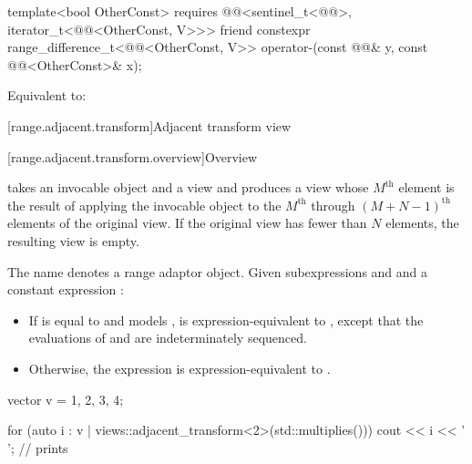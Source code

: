 %
\begin{itemdecl}
template<bool OtherConst>
  requires @@<sentinel_t<@@>, iterator_t<@@<OtherConst, V>>>
friend constexpr range_difference_t<@@<OtherConst, V>>
  operator-(const @@& y, const @@<OtherConst>& x);
\end{itemdecl}

\begin{itemdescr}
\pnum
\effects
Equivalent to: 
\end{itemdescr}

[range.adjacent.transform]{Adjacent transform view}

[range.adjacent.transform.overview]{Overview}

\pnum
{} takes an invocable object and
a view and produces a view
whose $M^\text{th}$ element is the result of applying the invocable object
to the $M^\text{th}$ through $(M + N - 1)^\text{th}$ elements
of the original view.
If the original view has fewer than $N$ elements, the resulting view is empty.

\pnum
{}%
The name  denotes
a range adaptor object.
Given subexpressions  and  and
a constant expression :
\begin{itemize}
\item
If  is equal to  and
 models ,
 is expression-equivalent to
,
except that the evaluations of  and  are
indeterminately sequenced.
\item
Otherwise,
the expression  is
expression-equivalent to
.
\end{itemize}

\pnum
\begin{example}
\begin{codeblock}
vector v = {1, 2, 3, 4};

for (auto i : v | views::adjacent_transform<2>(std::multiplies())) {
  cout << i << ' ';     // prints 
}
\end{codeblock}
\end{example}

